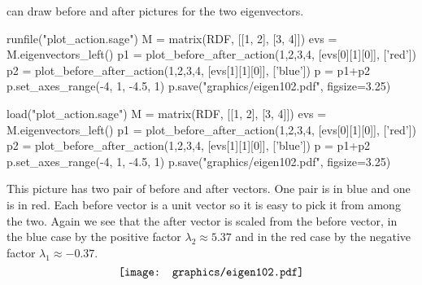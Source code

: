 \Sage{} can draw before and after pictures for the two eigenvectors.
\begin{sageoutput}[d,0,3]
runfile("plot_action.sage")  
M = matrix(RDF, [[1, 2], [3, 4]])
evs = M.eigenvectors_left()  
p1 = plot_before_after_action(1,2,3,4, [evs[0][1][0]], ['red']) 
p2 = plot_before_after_action(1,2,3,4, [evs[1][1][0]], ['blue']) 
p = p1+p2
p.set_axes_range(-4, 1, -4.5, 1) 
p.save("graphics/eigen102.pdf", figsize=3.25)
\end{sageoutput}
\begin{sagesilent}
load("plot_action.sage")  
M = matrix(RDF, [[1, 2], [3, 4]])
evs = M.eigenvectors_left()  
p1 = plot_before_after_action(1,2,3,4, [evs[0][1][0]], ['red']) 
p2 = plot_before_after_action(1,2,3,4, [evs[1][1][0]], ['blue']) 
p = p1+p2
p.set_axes_range(-4, 1, -4.5, 1) 
p.save("graphics/eigen102.pdf", figsize=3.25)
\end{sagesilent}
\noindent
This picture has two pair of before and after vectors.
One pair is in blue and one is in red.
Each before vector is a unit vector so it is easy to pick it from among the
two.
Again we see that 
the after vector is scaled from the before vector, 
in the blue case by the positive factor $\lambda_2\approx 5.37$ and
in the red case by the negative factor $\lambda_1\approx -0.37$.
\begin{equation*}
  \vcenteredhbox{\texttt{[image: graphics/eigen102.pdf]}}
\end{equation*}




